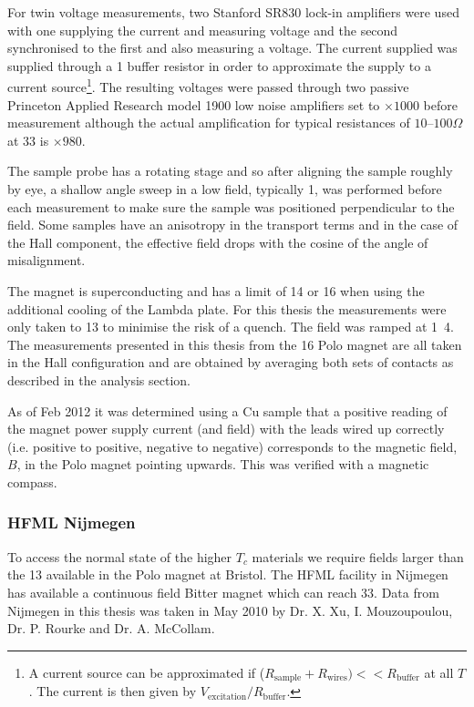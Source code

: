 For twin voltage measurements, two Stanford SR830 lock-in amplifiers were used with one supplying the current and measuring voltage and the second synchronised to the first and also measuring a voltage. The current supplied was supplied through a \unit{1}{\kilo\ohm} buffer resistor in order to approximate the supply to a current source\footnote{A current source can be approximated if ($R_{\textrm{sample}} + R_{\textrm{wires}}) << R_{\textrm{buffer}} $ at all $T$. The current is then given by $V_{\textrm{excitation}}/R_{\textrm{buffer}}$.}. The resulting voltages were passed through two passive Princeton Applied Research model 1900 low noise amplifiers set to $\times1000$ before measurement although the actual amplification for typical resistances of $10$--$100\Omega$ at \unit{33}{\hertz} is $\times 980$.

The sample probe has a rotating stage and so after aligning the sample roughly by eye, a shallow angle sweep in a low field, typically \unit{1}{\tesla}, was performed before each measurement to make sure the sample was positioned perpendicular to the field. Some samples have an anisotropy in the transport terms and in the case of the Hall component, the effective field drops with the cosine of the angle of misalignment.

The magnet is superconducting and has a limit of \unit{14}{\tesla} or \unit{16}{\tesla} when using the additional cooling of the Lambda plate. For this thesis the measurements were only taken to \unit{13}{\tesla} to minimise the risk of a quench. The field was ramped at \unit{1.4}{\tesla\per\minute}. The measurements presented in this thesis from the \unit{16}{\tesla} Polo magnet are all taken in the Hall configuration and are obtained by averaging both sets of contacts as described in the analysis section.

As of Feb 2012 it was determined using a Cu sample that a positive reading of the magnet power supply current (and field) with the leads wired up correctly (i.e. positive to positive, negative to negative) corresponds to the magnetic field, $B$, in the Polo magnet pointing upwards. This was verified with a magnetic compass.


\subsubsection{\acs{HFML} Nijmegen}

To access the normal state of the higher $T_c$ materials we require fields larger than the \unit{13}{\tesla} available in the Polo magnet at Bristol. The \acf{HFML} facility in Nijmegen has available a continuous field Bitter magnet which can reach \unit{33}{\tesla}. Data from Nijmegen in this thesis was taken in May 2010 by Dr. X. Xu, I. Mouzoupoulou, Dr. P. Rourke and Dr. A. McCollam.

